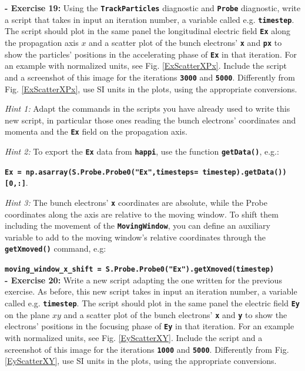 \documentclass{article}
\newcommand{\commandline}[1]{\texttt{\textbf{#1}}}
\begin{document}
\textbf{- Exercise 19:} Using the \commandline{TrackParticles} diagnostic and \commandline{Probe} diagnostic, write a script that takes in input an iteration number, a variable called e.g. \commandline{timestep}. The script should plot in the same panel the longitudinal electric field \commandline{Ex} along the propagation axis $x$ and a scatter plot of the bunch electrons' \commandline{x} and \commandline{px} to show the particles' positions in the accelerating phase of \commandline{Ex} in that iteration. For an example with normalized units, see Fig. \ref{ExScatterXPx}. Include the script and a screenshot of this image for the iterations \commandline{3000} and \commandline{5000}.  Differently from Fig.  \ref{ExScatterXPx}, use SI units in the plots, using the appropriate conversions.

\textit{Hint 1:} Adapt the commands in the scripts you have already used to write this new script, in particular those ones reading the bunch electrons' coordinates and momenta and the \commandline{Ex} field on the propagation axis.

\textit{Hint 2:} To export the \commandline{Ex} data from \commandline{happi}, use the function \commandline{getData()}, e.g.:

\commandline{Ex = np.asarray(S.Probe.Probe0("Ex",timesteps= timestep).getData())[0,:]}.

\textit{Hint 3:} The bunch electrons' \commandline{x} coordinates are absolute, while the Probe coordinates along the axis are relative to the moving window. To shift them including the movement of the \commandline{MovingWindow}, you can define an auxiliary variable to add to the moving window's relative coordinates through the \commandline{getXmoved()} command, e.g:

\commandline{moving\_window\_x\_shift = S.Probe.Probe0("Ex").getXmoved(timestep)}
\\



\textbf{- Exercise 20:} Write a new script adapting the one written for the previous exercise. As before, this new script takes in input an iteration number, a variable called e.g. \commandline{timestep}. The script should plot in the same panel the electric field \commandline{Ey} on the plane $xy$ and a scatter plot of the bunch electrons' \commandline{x} and \commandline{y} to show the electrons' positions in the focusing phase of \commandline{Ey} in that iteration. For an example with normalized units, see Fig. \ref{EyScatterXY}. Include the script and a screenshot of this image for the iterations \commandline{1000} and \commandline{5000}. Differently from Fig.  \ref{EyScatterXY}, use SI units in the plots, using the appropriate conversions.
\end{document}
